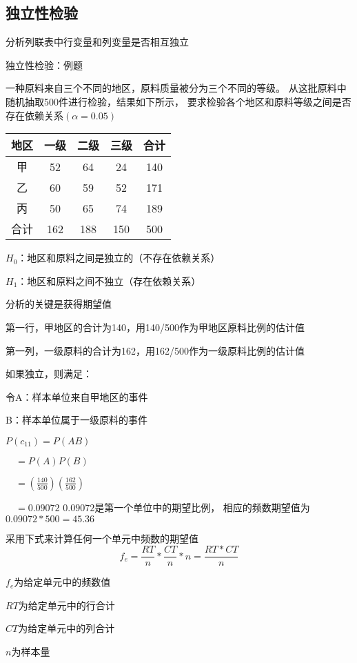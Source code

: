 \documentclass[UTF8,10pt]{book}
\begin{document}
\subsection{独立性检验}	
分析列联表中行变量和列变量是否相互独立	

独立性检验：例题 

一种原料来自三个不同的地区，原料质量被分为三个不同的等级。
从这批原料中随机抽取500件进行检验，结果如下所示，
要求检验各个地区和原料等级之间是否存在依赖关系$(\alpha = 0.05)$ 


\begin{tabular}{|c|c|c|c|c|}%
    \hline  %
    地区 & 一级 & 二级 &  三级 & 合计  \\
    \hline  %
    甲 & 52 & 64 & 24 & 140   \\
    \hline %
    乙 &60 &59 &52 &171  \\
    \hline
    丙 &50 &65 &74 &189 \\
    \hline
    合计&162& 188 &150& 500\\
    \hline
    \end{tabular}


$H_0$：地区和原料之间是独立的（不存在依赖关系） 

$H_1$：地区和原料之间不独立（存在依赖关系） 

分析的关键是获得期望值 

第一行，甲地区的合计为140，用140/500作为甲地区原料比例的估计值 

第一列，一级原料的合计为162，用162/500作为一级原料比例的估计值 

如果独立，则满足： 

令A：样本单位来自甲地区的事件 

B：样本单位属于一级原料的事件 

$P(c_{11}) = P(AB)$ 

$\quad = P(A)P(B)$ 

$\quad = (\frac{140}{500})( \frac{162}{500})$ 

$\quad = 0.09072$ $ 0.09072$是第一个单位中的期望比例，
相应的频数期望值为$0.09072*500 = 45.36$ 

采用下式来计算任何一个单元中频数的期望值 
$$f_e= \frac{RT}{n}*\frac{CT}{n} * n = \frac{RT*CT}{n}$$ 

$f_e$为给定单元中的频数值 

$RT$为给定单元中的行合计 

$CT$为给定单元中的列合计 

$n$为样本量 
\end{document}
